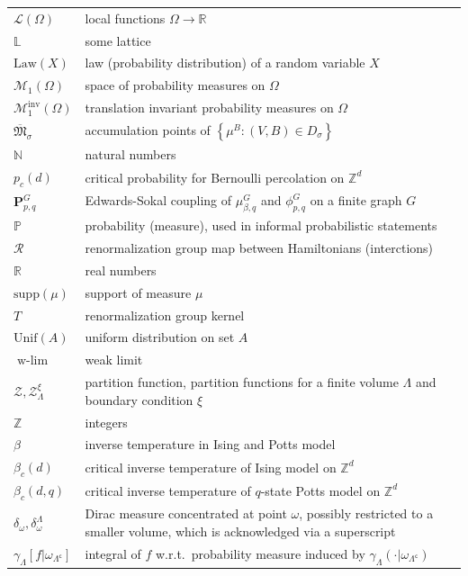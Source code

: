 \documentclass[12pt]{article}
\newcommand{\Loc}{\mathcal{L}}
\renewcommand{\L}{\mathbb{L}}
\newcommand{\M}{\mathcal{M}}
\newcommand{\N}{\mathbb{N}}
\renewcommand{\P}{\mathbb{P}}
\newcommand{\PP}{\mathbf{P}}
\newcommand{\R}{\mathbb{R}}
\newcommand{\RR}{\mathcal{R}}
\newcommand{\Z}{\mathbb{Z}}
\newcommand{\ZZ}{\mathcal{Z}}
\newcommand{\set}[1]{\left\{#1\right\}}
\newcommand{\ra}{\rightarrow}
\newcommand{\pika}{\boldsymbol{\cdot}}
\newcommand{\1}{\mathbbm{1}}
\renewcommand{\c}{\mathsf{c}}
\newcommand{\supp}{\mathrm{supp}}
\newcommand{\5}{\vspace{0.5cm}}
\theoremstyle{definition}
\begin{document}
\begin{tabular}{p{4cm}p{10cm}}
$\Loc(\Omega)$ & local functions $\Omega\ra\R$ \\
$\L$ & some lattice \\
$\mathrm{Law}(X)$ & law (probability distribution) of a random variable $X$ \\
$\M_1(\Omega)$ & space of probability measures on $\Omega$ \\
$\M_1^{\mathrm{inv}}(\Omega)$ & translation invariant probability measures on $\Omega$ \\
$\overline{\mathfrak{M}}_{\sigma}$ & accumulation points of $\set{\mu^B:(V,B)\in D_\sigma}$ \\
$\N$ & natural numbers \\
$p_c(d)$ & critical probability for Bernoulli percolation on $\Z^d$ \\
$\PP_{p,q}^G$ & Edwards-Sokal coupling of $\mu_{\beta,q}^G$ and $\phi_{p,q}^G$ on a finite graph $G$ \\
$\P$ & probability (measure), used in informal probabilistic statements \\
$\RR$ & renormalization group map between Hamiltonians (interctions) \\
$\R$ & real numbers \\
$\supp(\mu)$ & support of measure $\mu$ \\
$T$ & renormalization group kernel \\
$\mathrm{Unif}(A)$ & uniform distribution on set $A$ \\
$\text{w-}\!\lim$ & weak limit \\
$\ZZ,\ZZ_\Lambda^\xi$ & partition function, partition functions for a finite volume $\Lambda$ and boundary condition $\xi$ \\
$\Z$ & integers \\
$\beta$ & inverse temperature in Ising and Potts model \\
$\beta_c(d)$ & critical inverse temperature of Ising model on $\Z^d$ \\
$\beta_c(d,q)$ & critical inverse temperature of $q$-state Potts model on $\Z^d$ \\
$\delta_\omega,\delta_\omega^\Lambda$ & Dirac measure concentrated at point $\omega$, possibly restricted to a smaller volume, which is acknowledged via a superscript \\
$\gamma_\Lambda[f|\omega_{\Lambda^\c}]$  & integral of $f$ w.r.t.~probability measure induced by $\gamma_\Lambda(\pika|\omega_{\Lambda^\c})$ \\

\end{tabular}
\end{document}
